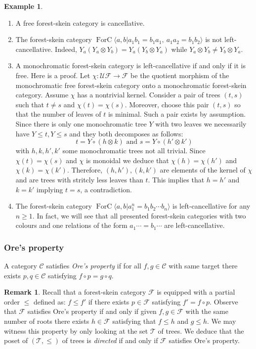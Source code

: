 \documentclass[a4paper, 12pt]{amsart}
\numberwithin{equation}{section}
\theoremstyle{definition}
\newtheorem{remark}[theorem]{Remark}
\newtheorem{example}[theorem]{Example}
\newcommand{\cC}{\mathcal C}
\newcommand{\cF}{\mathcal F}
\DeclareMathOperator{\FC}{ForC}
\newcommand{\la}{\langle}
\newcommand{\ot}{\otimes}
\newcommand{\ra}{\rangle}
\newcommand{\cT}{\mathcal T}
\newcommand{\cUF}{\mathcal{UF}}
\begin{document}
\begin{example}\label{ex:LC}
\begin{enumerate}
\item A free forest-skein category is cancellative. 
\item 
The forest-skein category $\FC\langle a,b| a_1b_1=b_1a_1, \ a_1a_2=b_1b_2\rangle$ is not left-cancellative. Indeed, $Y_a(Y_a\ot Y_b)=Y_a(Y_b\ot Y_a)$ while $Y_a\ot Y_b\neq Y_b\ot Y_a.$
\item A monochromatic forest-skein category is left-cancellative if and only if it is free.
Here is a proof. 
Let $\chi:\cUF\to\cF$ be the quotient morphism of the monochromatic free forest-skein category onto a monochromatic forest-skein category.
Assume $\chi$ has a nontrivial kernel. Consider a pair of trees $(t,s)$ such that $t\neq s$ and $\chi(t)=\chi(s)$. 
Moreover, choose this pair $(t,s)$ so that the number of leaves of $t$ is minimal.
Such a pair exists by assumption.
Since there is only one monochromatic tree $Y$ with two leaves we necessarily have $Y\leq t, Y\leq s$ and they both decomposes as follows:
$$t=Y\circ(h\ot k) \text{ and } s=Y\circ(h'\ot k')$$
with $h,k,h',k'$ some monochromatic trees not all trivial.
Since $\chi(t)=\chi(s)$ and $\chi$ is monoidal we deduce that $\chi(h)=\chi(h')$ and $\chi(k)=\chi(k')$.
Therefore, $(h,h'),(k,k')$ are elements of the kernel of $\chi$ and are trees with stritcly less leaves than $t$.
This implies that $h=h'$ and $k=k'$ implying $t=s$, a contradiction.
\item The forest-skein category $\FC\la a,b| a_1^n=b_1b_2\cdots b_n\ra$ is left-cancellative for any $n\geq 1$.
In fact, we will see that all presented forest-skein categories with two colours and one relations of the form $a_1\cdots=b_1\cdots$ are left-cancellative.
\end{enumerate}
\end{example}

\subsubsection{Ore's property}
A category $\cC$ satisfies {\it Ore's property} if for all $f,g\in\cC$ with same target there exists $p,q\in\cC$ satisfying $f\circ p=g\circ q.$

\begin{remark}
Recall that a forest-skein category $\cF$ is equipped with a partial order $\leq$ defined as: $f\leq f'$ if there exists $p\in\cF$ satisfying $f'=f\circ p.$
Observe that $\cF$ satisfies Ore's property if and only if given $f,g\in\cF$ with the same number of roots there exists $h\in\cF$ satisfying that $f\leq h$ and $g\leq h$.
We may witness this property by only looking at the set $\cT$ of trees. We deduce that the poset of $(\cT,\leq)$ of trees is {\it directed} if and only if $\cF$ satisfies Ore's property.
\end{remark}
\end{document}
